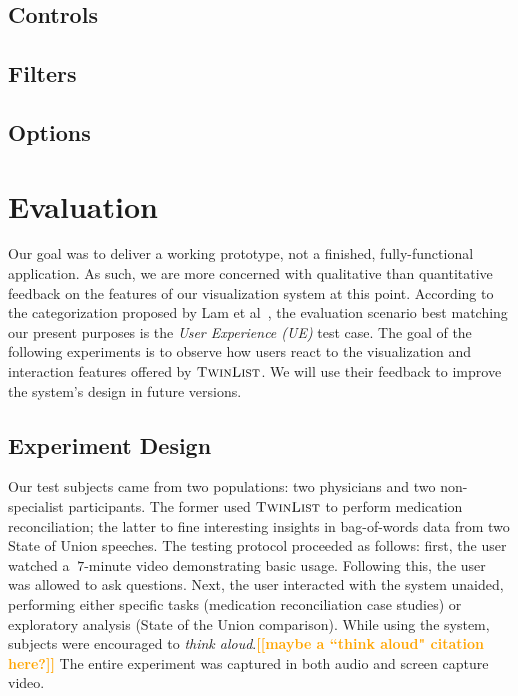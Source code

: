 \documentclass{chi2009}
\newcommand{\todo}[1]{\textsf{\textbf{\textcolor{Orange}{[[#1]]}}}}
\newcommand{\TwinList}{\textsc{TwinList}}
\begin{document}
\subsection{Controls}

\subsection{Filters}

\subsection{Options}

\section{Evaluation}
Our goal was to deliver a working prototype, not a finished, fully-functional application. As such, we are more concerned with qualitative than quantitative feedback on the features of our visualization system at this point. According to the categorization proposed by Lam et al~\cite{lam-bertini-isenberg-plaisant-carpendale-2011}, the evaluation scenario best matching our present purposes is the \textit{User Experience (UE)} test case. The goal of the following experiments is to observe how users react to the visualization and interaction features offered by $\TwinList$. We will use their feedback to improve the system's design in future versions.

\subsection{Experiment Design}
Our test subjects came from two populations: two physicians and two non-specialist participants. The former used $\TwinList$ to perform medication reconciliation; the latter to fine interesting insights in bag-of-words data from two State of Union speeches. The testing protocol proceeded as follows: first, the user watched a $~7$-minute video demonstrating basic usage. Following this, the user was allowed to ask questions. Next, the user interacted with the system unaided, performing either specific tasks (medication reconciliation case studies) or exploratory analysis (State of the Union comparison). While using the system, subjects were encouraged to \textit{think aloud}.\todo{maybe a ``think aloud" citation here?} The entire experiment was captured in both audio and screen capture video.
\end{document}
